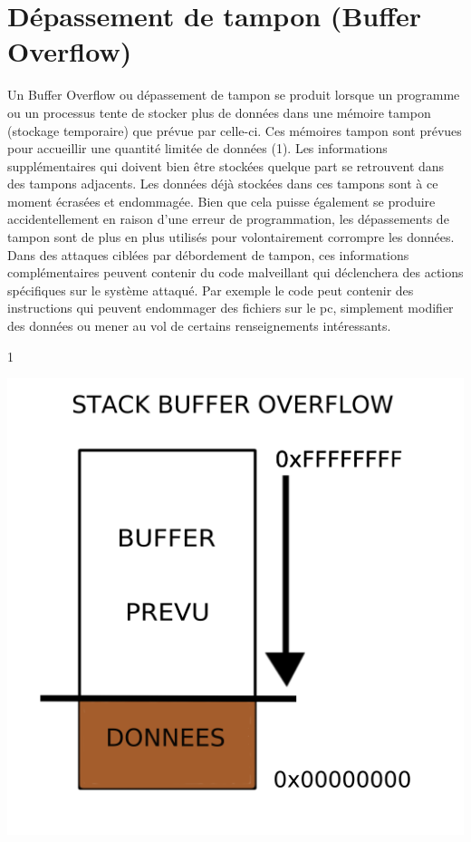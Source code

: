 

\newpage
\section{Dépassement de tampon (Buffer Overflow)}\label{vulnerabilites:applicatives:buffer-overflow}

Un Buffer Overflow ou dépassement de tampon se produit lorsque un programme ou un processus tente de stocker plus de données dans une mémoire tampon (stockage temporaire) que prévue par celle-ci. Ces mémoires tampon sont prévues pour accueillir une quantité limitée de données (1). Les informations supplémentaires qui doivent bien être stockées quelque part se retrouvent dans des tampons adjacents. Les données déjà stockées dans ces tampons sont à ce moment écrasées et endommagée. Bien que cela puisse également se produire accidentellement en raison d'une erreur de programmation, les dépassements de tampon sont de plus en plus utilisés pour volontairement corrompre les données. Dans des attaques ciblées par débordement de tampon,   ces informations complémentaires peuvent contenir du code malveillant qui déclenchera des actions spécifiques sur le système attaqué. Par exemple le code peut contenir des instructions qui peuvent endommager des fichiers sur le pc, simplement modifier des données ou mener au vol de certains renseignements intéressants.

\begin{center}
\caption{1}
\includegraphics[scale=2]{Application/assets/bo5.png}
\end{center}


